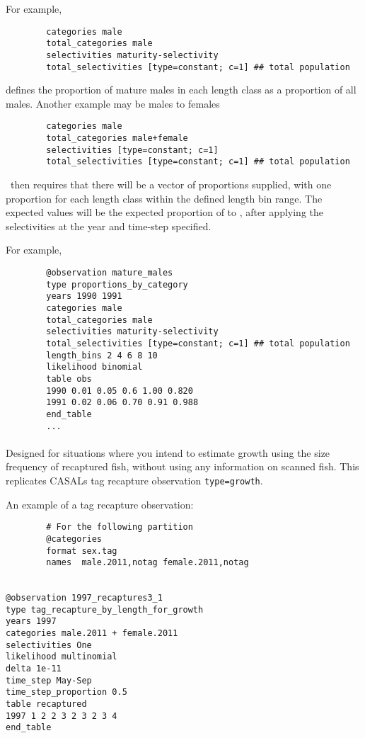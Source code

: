 For example,

{\small{\begin{verbatim}
		categories male
		total_categories male
		selectivities maturity-selectivity
		total_selectivities [type=constant; c=1] ## total population
		\end{verbatim}}}
defines the proportion of mature males in each length class as a proportion of all males. Another example may be males to females
{\small{\begin{verbatim}
		categories male
		total_categories male+female
		selectivities [type=constant; c=1]
		total_selectivities [type=constant; c=1] ## total population
		\end{verbatim}}}
\CNAME\ then requires that there will be a vector of proportions supplied, with one proportion for each length class within the defined length bin range. The expected values will be the expected proportion of  to , after applying the selectivities at the year and time-step specified.

For example,

{\small{\begin{verbatim}
		@observation mature_males
		type proportions_by_category
		years 1990 1991
		categories male
		total_categories male
		selectivities maturity-selectivity
		total_selectivities [type=constant; c=1] ## total population
		length_bins 2 4 6 8 10 
		likelihood binomial
		table obs
		1990 0.01 0.05 0.6 1.00 0.820
		1991 0.02 0.06 0.70 0.91 0.988
		end_table
		...
		\end{verbatim}}}

\paragraph*{\label{sec:Observation-TagRecaptureByLengthForGrowth}}
Designed for situations where you intend to estimate growth using the size frequency of recaptured fish, without using any information on scanned fish. This replicates CASALs tag recapture observation \texttt{type=growth}. 
 
An example of a tag recapture observation:

{\small{\begin{verbatim}
		# For the following partition
		@categories
		format sex.tag
		names  male.2011,notag female.2011,notag
		

@observation 1997_recaptures3_1
type tag_recapture_by_length_for_growth
years 1997
categories male.2011 + female.2011
selectivities One
likelihood multinomial
delta 1e-11
time_step May-Sep
time_step_proportion 0.5
table recaptured
1997 1 2 2 3 2 3 2 3 4
end_table
\end{verbatim}}}

